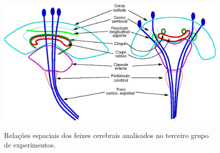 
 
 
 \begin{figure}[H]
 \includegraphics[width=.9\linewidth, angle=0]{figs/esboco_feixes_antomicos.png}
    \label{fig::esquema_corona_radiata}
    
    \caption{Relações espaciais dos feixes cerebrais analisados no terceiro grupo de experimentos.}
    \label{fig::relacoes_espaciais_feixes}
 \end{figure}

